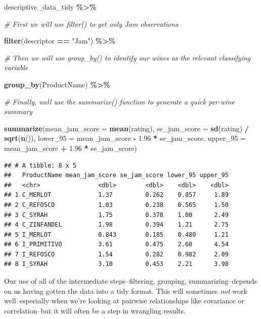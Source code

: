 \documentclass[
]{book}
\newenvironment{Shaded}{\begin{snugshade}}{\end{snugshade}}
\newcommand{\AttributeTok}[1]{\textcolor[rgb]{0.13,0.29,0.53}{#1}}
\newcommand{\CommentTok}[1]{\textcolor[rgb]{0.56,0.35,0.01}{\textit{#1}}}
\newcommand{\FloatTok}[1]{\textcolor[rgb]{0.00,0.00,0.81}{#1}}
\newcommand{\FunctionTok}[1]{\textcolor[rgb]{0.13,0.29,0.53}{\textbf{#1}}}
\newcommand{\NormalTok}[1]{#1}
\newcommand{\SpecialCharTok}[1]{\textcolor[rgb]{0.81,0.36,0.00}{\textbf{#1}}}
\newcommand{\StringTok}[1]{\textcolor[rgb]{0.31,0.60,0.02}{#1}}
\begin{document}
\begin{Shaded}
\begin{Highlighting}[]
\NormalTok{descriptive\_data\_tidy }\SpecialCharTok{\%\textgreater{}\%}

\CommentTok{\# First we will use filter() to get only Jam observations}
  
  \FunctionTok{filter}\NormalTok{(descriptor }\SpecialCharTok{==} \StringTok{"Jam"}\NormalTok{) }\SpecialCharTok{\%\textgreater{}\%}
  
\CommentTok{\# Then we will use group\_by() to identify our wines as the relevant classifying variable}
  
  \FunctionTok{group\_by}\NormalTok{(ProductName) }\SpecialCharTok{\%\textgreater{}\%}
  
\CommentTok{\# Finally, we\textquotesingle{}ll use the summarize() function to generate a quick per{-}wine summary}
  
  \FunctionTok{summarize}\NormalTok{(}\AttributeTok{mean\_jam\_score =} \FunctionTok{mean}\NormalTok{(rating),}
            \AttributeTok{se\_jam\_score =} \FunctionTok{sd}\NormalTok{(rating) }\SpecialCharTok{/} \FunctionTok{sqrt}\NormalTok{(}\FunctionTok{n}\NormalTok{()),}
            \AttributeTok{lower\_95 =}\NormalTok{ mean\_jam\_score }\SpecialCharTok{{-}} \FloatTok{1.96} \SpecialCharTok{*}\NormalTok{ se\_jam\_score,}
            \AttributeTok{upper\_95 =}\NormalTok{ mean\_jam\_score }\SpecialCharTok{+} \FloatTok{1.96} \SpecialCharTok{*}\NormalTok{ se\_jam\_score)}
\end{Highlighting}
\end{Shaded}

\begin{verbatim}
## # A tibble: 8 x 5
##   ProductName mean_jam_score se_jam_score lower_95 upper_95
##   <chr>                <dbl>        <dbl>    <dbl>    <dbl>
## 1 C_MERLOT             1.37         0.262    0.857     1.89
## 2 C_REFOSCO            1.03         0.238    0.565     1.50
## 3 C_SYRAH              1.75         0.378    1.00      2.49
## 4 C_ZINFANDEL          1.98         0.394    1.21      2.75
## 5 I_MERLOT             0.843        0.185    0.480     1.21
## 6 I_PRIMITIVO          3.61         0.475    2.68      4.54
## 7 I_REFOSCO            1.54         0.282    0.982     2.09
## 8 I_SYRAH              3.10         0.453    2.21      3.98
\end{verbatim}

Our use of all of the intermediate steps--filtering, grouping, summarizing--depends on us having gotten the data into a tidy format. This will sometimes \emph{not} work well--especially when we're looking at pairwise relationships like covariance or correlation--but it will often be a step in wrangling results.
\end{document}
